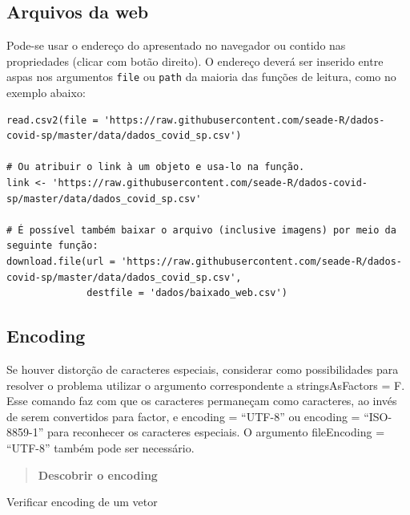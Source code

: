 \documentclass[
]{book}
\newenvironment{Shaded}{\begin{snugshade}}{\end{snugshade}}
\newcommand{\AttributeTok}[1]{\textcolor[rgb]{0.13,0.29,0.53}{#1}}
\newcommand{\DecValTok}[1]{\textcolor[rgb]{0.00,0.00,0.81}{#1}}
\newcommand{\FunctionTok}[1]{\textcolor[rgb]{0.13,0.29,0.53}{\textbf{#1}}}
\newcommand{\NormalTok}[1]{#1}
\newcommand{\SpecialCharTok}[1]{\textcolor[rgb]{0.81,0.36,0.00}{\textbf{#1}}}
\theoremstyle{definition}
\theoremstyle{definition}
\theoremstyle{definition}
\theoremstyle{definition}
\theoremstyle{remark}
\begin{document}
\hypertarget{arquivos-da-web}{%
\subsection{Arquivos da web}\label{arquivos-da-web}}

Pode-se usar o endereço do apresentado no navegador ou contido nas propriedades (clicar com botão direito). O endereço deverá ser inserido entre aspas nos argumentos \texttt{file} ou \texttt{path} da maioria das funções de leitura, como no exemplo abaixo:

\begin{verbatim}
read.csv2(file = 'https://raw.githubusercontent.com/seade-R/dados-covid-sp/master/data/dados_covid_sp.csv')  

# Ou atribuir o link à um objeto e usa-lo na função.  
link <- 'https://raw.githubusercontent.com/seade-R/dados-covid-sp/master/data/dados_covid_sp.csv'

# É possível também baixar o arquivo (inclusive imagens) por meio da seguinte função:  
download.file(url = 'https://raw.githubusercontent.com/seade-R/dados-covid-sp/master/data/dados_covid_sp.csv', 
              destfile = 'dados/baixado_web.csv')
\end{verbatim}

\hypertarget{encoding}{%
\subsection{Encoding}\label{encoding}}

Se houver distorção de caracteres especiais, considerar como possibilidades para resolver o problema utilizar o argumento correspondente a stringsAsFactors = F. Esse comando faz com que os caracteres permaneçam como caracteres, ao invés de serem convertidos para factor, e encoding = ``UTF-8'' ou encoding = ``ISO-8859-1'' para reconhecer os caracteres especiais. O argumento fileEncoding = ``UTF-8'' também pode ser necessário.

\begin{quote}
\textbf{Descobrir o encoding}
\end{quote}

Verificar encoding de um vetor

\begin{Shaded}
\end{Shaded}
\end{document}
